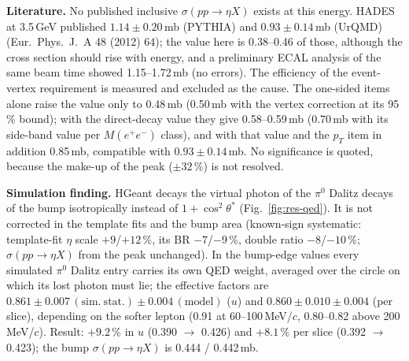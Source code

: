 \documentclass[11pt,a4paper]{article}
\newcommand{\piz}{\ensuremath{\pi^{0}}\xspace}
\newcommand{\Mee}{\ensuremath{M(e^{+}e^{-})}\xspace}
\newcommand{\sigeta}{\ensuremath{\sigma(pp\to\eta X)}\xspace}
\begin{document}
\textbf{Literature.} No published inclusive \sigeta exists at this energy. HADES at 3.5\,GeV published $1.14\pm0.20$\,mb (PYTHIA) and $0.93\pm0.14$\,mb
(UrQMD) (Eur.\ Phys.\ J.\ A 48 (2012) 64); the value here is 0.38--0.46 of those, although the cross section should rise with energy, and a
preliminary ECAL analysis of the same beam time showed 1.15--1.72\,mb (no errors). The efficiency of the event-vertex requirement is measured and excluded as the cause. The
one-sided items alone raise the value only to 0.48\,mb (0.50\,mb with the vertex correction at its 95\,\% bound); with the direct-decay value they
give 0.58--0.59\,mb (0.70\,mb with its side-band value per \Mee class), and with that value and the $p_T$ item in addition 0.85\,mb, compatible
with $0.93\pm0.14$\,mb. No significance is quoted, because the make-up of the peak ($\pm32$\,\%) is not resolved.

\textbf{Simulation finding.} HGeant decays the virtual photon of the \piz Dalitz decays of the bump isotropically instead of $1+\cos^2\theta^*$
(Fig.~\ref{fig:res-qed}). It is not corrected in the template fits and the bump area (known-sign systematic: template-fit $\eta$ scale
$+9$/$+12$\,\%, its BR $-7$/$-9$\,\%, double ratio $-8$/$-10$\,\%; \sigeta from the peak unchanged). In the bump-edge values every simulated \piz
Dalitz entry carries its own QED weight, averaged over the circle on which its lost photon must lie; the effective factors are
$0.861\pm0.007\,(\mathrm{sim.\ stat.})\pm0.004\,(\mathrm{model})$ ($u$) and $0.860\pm0.010\pm0.004$ (per slice), depending on the softer lepton
(0.91 at 60--100\,MeV/$c$, 0.80--0.82 above 200\,MeV/$c$). Result: $+9.2$\,\% in $u$ (0.390 $\to$ 0.426) and $+8.1$\,\% per slice
(0.392 $\to$ 0.423); the bump \sigeta is 0.444 / 0.442\,mb.

\end{document}
